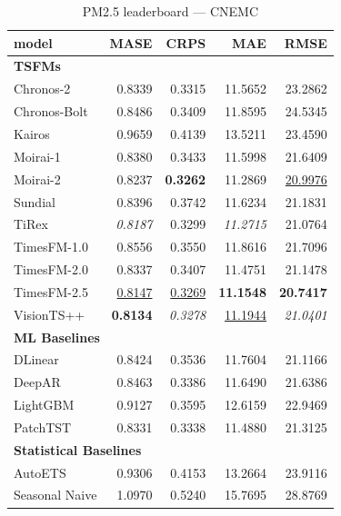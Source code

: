 \begin{table}[H]
\caption{PM2.5 leaderboard --- CNEMC}
\centering
\begin{small}
\begin{tabular}{lrrrr}
\toprule
model & MASE & CRPS & MAE & RMSE \\
\midrule
\multicolumn{5}{l}{\textbf{TSFMs}} \\
Chronos-2 & 0.8339 & 0.3315 & 11.5652 & 23.2862 \\
Chronos-Bolt & 0.8486 & 0.3409 & 11.8595 & 24.5345 \\
Kairos & 0.9659 & 0.4139 & 13.5211 & 23.4590 \\
Moirai-1 & 0.8380 & 0.3433 & 11.5998 & 21.6409 \\
Moirai-2 & 0.8237 & \textbf{0.3262} & 11.2869 & \underline{20.9976} \\
Sundial & 0.8396 & 0.3742 & 11.6234 & 21.1831 \\
TiRex & \textit{0.8187} & 0.3299 & \textit{11.2715} & 21.0764 \\
TimesFM-1.0 & 0.8556 & 0.3550 & 11.8616 & 21.7096 \\
TimesFM-2.0 & 0.8337 & 0.3407 & 11.4751 & 21.1478 \\
TimesFM-2.5 & \underline{0.8147} & \underline{0.3269} & \textbf{11.1548} & \textbf{20.7417} \\
VisionTS++ & \textbf{0.8134} & \textit{0.3278} & \underline{11.1944} & \textit{21.0401} \\
\midrule
\multicolumn{5}{l}{\textbf{ML Baselines}} \\
DLinear & 0.8424 & 0.3536 & 11.7604 & 21.1166 \\
DeepAR & 0.8463 & 0.3386 & 11.6490 & 21.6386 \\
LightGBM & 0.9127 & 0.3595 & 12.6159 & 22.9469 \\
PatchTST & 0.8331 & 0.3338 & 11.4880 & 21.3125 \\
\midrule
\multicolumn{5}{l}{\textbf{Statistical Baselines}} \\
AutoETS & 0.9306 & 0.4153 & 13.2664 & 23.9116 \\
Seasonal Naive & 1.0970 & 0.5240 & 15.7695 & 28.8769 \\
\bottomrule
\end{tabular}
\end{small}
\end{table}